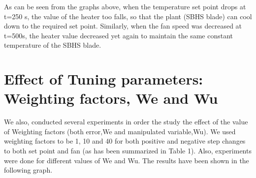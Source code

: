 As can be seen from the graphs above, when the temperature set point drops at t=250 s, the value of the heater too falls, so that the plant (SBHS blade) can cool down to the required set point. Similarly, when the fan speed was decreased at t=500s, the heater value decreased yet again to maintain the same constant temperature of the SBHS blade.


\section{Effect of Tuning parameters: Weighting factors, We and Wu}
We also, conducted several experiments in order the study the effect of the value of Weighting factors (both error,We and manipulated variable,Wu). We used weighting factors to be 1, 10 and 40 for both positive and negative step changes to both set point and fan (as has been summarized in Table 1). Also, experiments were done for different values of We and Wu. The results have been shown in the following graph. 
